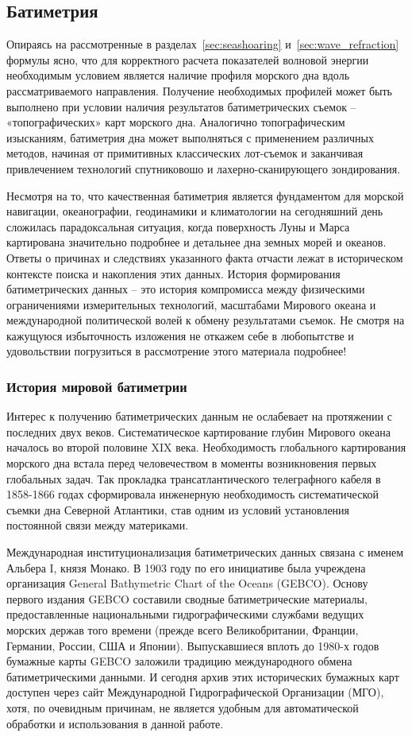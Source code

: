 
\subsection{Батиметрия}

Опираясь на рассмотренные в разделах~\ref{sec:seashoaring} и~\ref{sec:wave_refraction} формулы ясно, что для корректного расчета показателей волновой энергии необходимым условием является наличие профиля морского дна вдоль рассматриваемого направления.
Получение необходимых профилей может быть выполнено при условии наличия результатов батиметрических съемок -- «топографических» карт морского дна.
Аналогично топографическим изысканиям, батиметрия дна может выполняться с применением различных методов, начиная от примитивных классических лот-съемок и заканчивая привлечением технологий спутниковошо и лахерно-сканирующего зондирования.

Несмотря на то, что качественная батиметрия является фундаментом для морской навигации, океанографии, геодинамики и климатологии на сегодняшний день сложилась парадоксальная ситуация, когда поверхность Луны и Марса картирована значительно подробнее и детальнее дна земных морей и океанов.
Ответы о причинах и следствиях указанного факта отчасти лежат в историческом контексте поиска и накопления этих данных.
История формирования батиметрических данных -- это история компромисса между физическими ограничениями измерительных технологий, масштабами Мирового океана и международной политической волей к обмену результатами съемок.
Не смотря на кажущуюся избыточность изложения не откажем себе в любопытстве и удовольствии погрузиться в рассмотрение этого материала подробнее!

\subsubsection{История мировой батиметрии}

Интерес к получению батиметрических данным не ослабевает на протяжении с последних двух веков.
Систематическое картирование глубин Мирового океана началось во второй половине XIX века. 
Необходимость глобального картирования морского дна встала перед человечеством в моменты возникновения первых глобальных задач.
Так прокладка трансатлантического телеграфного кабеля в 1858-1866 годах сформировала инженерную необходимость систематической съемки дна Северной Атлантики, став одним из условий установления постоянной связи между материками.

Международная институционализация батиметрических данных связана с именем Альбера I, князя Монако. 
В 1903 году по его инициативе была учреждена организация General Bathymetric Chart of the Oceans (GEBCO).
Основу первого издания GEBCO составили сводные батиметрические материалы, предоставленные национальными гидрографическими службами ведущих морских держав того времени (прежде всего Великобритании, Франции, Германии, России, США и Японии).
Выпускавшиеся вплоть до 1980-х годов бумажные карты GEBCO заложили традицию международного обмена батиметрическими данными. 
И сегодня архив этих исторических бумажных карт доступен через сайт Международной Гидрографической Организации (МГО), хотя, по очевидным причинам, не является удобным для автоматической обработки и использования в данной работе.

